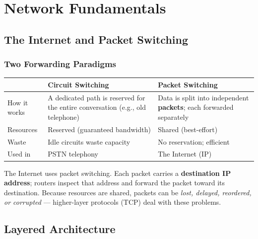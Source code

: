 \documentclass[oneside]{book}
\begin{document}
\chapter{Network Fundamentals}

\section{The Internet and Packet Switching}


\subsection*{Two Forwarding Paradigms}

\begin{center}
\begin{tabularx}{\linewidth}{lXX}
\toprule
 & \textbf{Circuit Switching} & \textbf{Packet Switching} \\
\midrule
How it works & A dedicated path is reserved for the entire conversation (e.g., old telephone) &
              Data is split into independent \textbf{packets}; each forwarded separately \\
Resources    & Reserved (guaranteed bandwidth) & Shared (best-effort) \\
Waste        & Idle circuits waste capacity & No reservation; efficient \\
Used in      & PSTN telephony & The Internet (IP) \\
\bottomrule
\end{tabularx}
\end{center}

The Internet uses packet switching.  Each packet carries a \textbf{destination IP
address}; routers inspect that address and forward the packet toward its destination.
Because resources are shared, packets can be \emph{lost, delayed, reordered, or
corrupted} --- higher-layer protocols (TCP) deal with these problems.

\section{Layered Architecture}
\end{document}
